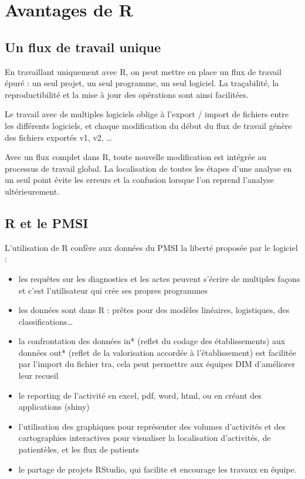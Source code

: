 \documentclass[]{book}
\providecommand{\tightlist}{%
  \setlength{\itemsep}{0pt}\setlength{\parskip}{0pt}}
\begin{document}
\section{Avantages de R}\label{avantages-de-r}

\subsection{Un flux de travail unique}\label{un-flux-de-travail-unique}

En travaillant uniquement avec R, on peut mettre en place un flux de
travail épuré : un seul projet, un seul programme, un seul logiciel. La
traçabilité, la reproductibilité et la mise à jour des opérations sont
ainsi facilitées.

Le travail avec de multiples logiciels oblige à l'export / import de
fichiers entre les différents logiciels, et chaque modification du début
du flux de travail génère des fichiers exportés v1, v2, \ldots{}

Avec un flux complet dans R, toute nouvelle modification est intégrée au
processus de travail global. La localisation de toutes les étapes d'une
analyse en un seul point évite les erreurs et la confusion lorsque l'on
reprend l'analyse ultérieurement.

\subsection{R et le PMSI}\label{r-et-le-pmsi}

L'utilisation de R confère aux données du PMSI la liberté proposée par
le logiciel :

\begin{itemize}
\tightlist
\item
  les requêtes sur les diagnostics et les actes peuvent s'écrire de
  multiples façons et c'est l'utilisateur qui crée ses propres
  programmes
\item
  les données sont dans R : prêtes pour des modèles linéaires,
  logistiques, des classifications\ldots{}
\item
  la confrontation des données in* (reflet du codage des établissements)
  aux données out* (reflet de la valorisation accordée à
  l'établissement) est facilitée par l'import du fichier tra, cela peut
  permettre aux équipes DIM d'améliorer leur recueil\\
\item
  le reporting de l'activité en excel, pdf, word, html, ou en créant des
  applications (shiny)
\item
  l'utilisation des graphiques pour représenter des volumes d'activités
  et des cartographies interactives pour visualiser la localisation
  d'activités, de patientèles, et les flux de patients
\item
  le partage de projets RStudio, qui facilite et encourage les travaux
  en équipe.
\end{itemize}
\end{document}

